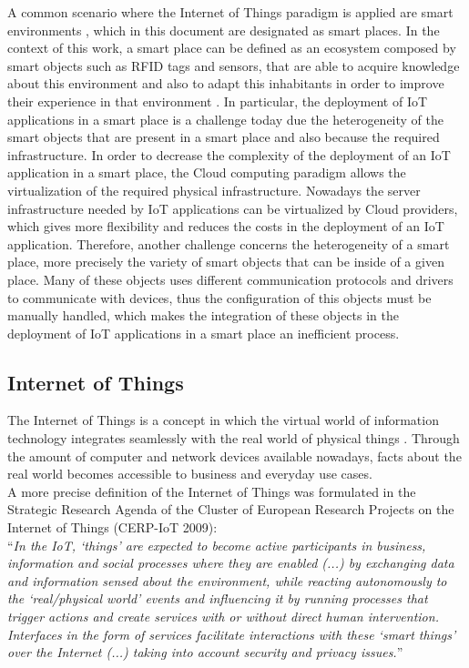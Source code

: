 A common scenario where the Internet of Things paradigm is applied are smart environments \cite{atzori2010internet},
which in this document are designated as smart places. In the context of this work,
a smart place can be defined as an ecosystem composed by smart objects such as RFID
tags and sensors, that are able to acquire knowledge about this environment and also to
adapt this inhabitants in order to improve their experience in that environment \cite{cook2004smart}.
In particular, the deployment of IoT applications in a smart place is a challenge today
due the heterogeneity of the smart objects that are present in a smart place and also
because the required infrastructure. In order to decrease the complexity of the deployment
of an IoT application in a smart place, the Cloud computing paradigm allows the virtualization
of the required physical infrastructure. Nowadays the server infrastructure needed by IoT
applications can be virtualized by Cloud providers, which gives more flexibility and reduces
the costs in the deployment of an IoT application. Therefore, another challenge concerns
the heterogeneity of a smart place, more precisely the variety of smart objects that
can be inside of a given place. Many of these objects uses different communication
protocols and drivers to communicate with devices, thus the configuration of this objects
must be manually handled, which makes the integration of these objects in the deployment of
IoT applications in a smart place an inefficient process.\\
\subsection{Internet of Things}
\label{sub:internet_of_things}
The Internet of Things is a concept in which the virtual world of information
technology integrates seamlessly with the real world of physical things \cite{Uckelmann:2011:AIT:2018904}.
Through the amount of computer and network devices available nowadays, facts about
the real world becomes accessible to business and everyday use cases.\\

A more precise definition of the Internet of Things was formulated in the Strategic
Research Agenda of the Cluster of European Research Projects on the Internet of Things (CERP-IoT 2009):\\

``\textit{In the IoT, `things' are expected to become active participants in business,
information and social processes where they are enabled (...) by exchanging data
and information  sensed about the environment, while reacting autonomously to the
`real/physical world' events and influencing it by running processes that trigger
actions and create services with or without direct human intervention. Interfaces
in the form of services facilitate interactions with these `smart things' over the
Internet (...) taking into account security and privacy issues.}''\\

